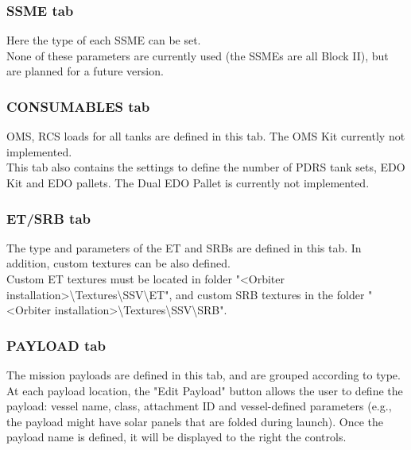 \documentclass[Space_Shuttle_Vessel_Manual.tex]{subfiles}
\begin{document}
\begin{multicols*}{2}
\subsubsection{SSME tab}
Here the type of each SSME can be set.\\
None of these parameters are currently used (the SSMEs are all Block II), but are planned for a future version.


\subsubsection{CONSUMABLES tab}
OMS, RCS loads for all tanks are defined in this tab. The OMS Kit currently not implemented.\\
This tab also contains the settings to define the number of PDRS tank sets, EDO Kit and EDO pallets. The Dual EDO Pallet is currently not implemented.


\subsubsection{ET/SRB tab}
The type and parameters of the ET and SRBs are defined in this tab. In addition, custom textures can be also defined.\\
Custom ET textures must be located in folder "<Orbiter installation>\textbackslash Textures\textbackslash SSV\textbackslash ET", and custom SRB textures in the folder "<Orbiter installation>\textbackslash Textures\textbackslash SSV\textbackslash SRB".


\subsubsection{PAYLOAD tab}
The mission payloads are defined in this tab, and are grouped according to type.\\
At each payload location, the "Edit Payload" button allows the user to define the payload: vessel name, class, attachment ID and vessel-defined parameters (e.g., the payload might have solar panels that are folded during launch). Once the payload name is defined, it will be displayed to the right the controls.


\end{multicols*}
\end{document}
